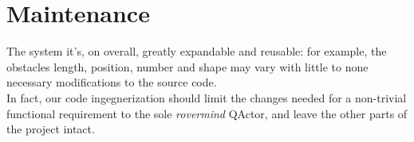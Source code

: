 \documentclass{llncs}
\newcommand{\labelsec}[1]{\label{sec:#1}}
\begin{document}

\section{Maintenance}
\labelsec{Maintenance}
The system it's, on overall, greatly expandable and reusable: for example, the obstacles length, position, number and shape may vary with little to none necessary modifications to the source code.\\
In fact, our code ingegnerization should limit the changes needed for a non-trivial functional requirement to the sole \textit{rovermind} QActor, and leave the other parts of the project intact.



\newpage



\end{document}
